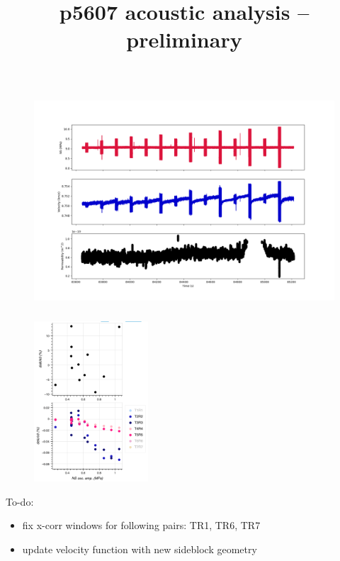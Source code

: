 \documentclass[aspectratio=169]{beamer}
\title{p5607 acoustic analysis -- preliminary}
\begin{document}
	
	
\begin{frame}[plain]
    \maketitle
\end{frame}


\begin{frame}{}

	\begin{figure}
		\centering
		\includegraphics[height=8cm]{../rel_chg_analysis/p5607_run1_prelim_tr5.png}
	\end{figure}

\end{frame}

\begin{frame}{}

	\begin{figure}
		\centering
		\includegraphics[height=6cm]{../rel_chg_analysis/p5607_run1_prelim_delc_NS.png}
	\end{figure}

\end{frame}


\begin{frame}{}
	
	\begin{alertblock}{To-do:}
		\begin{itemize}
			\item fix x-corr windows for following pairs: TR1, TR6, TR7
			\item update velocity function with new sideblock geometry
		\end{itemize}
	\end{alertblock}
	

\end{frame}
\end{document}
